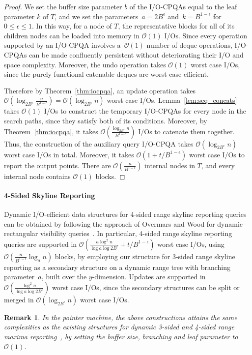 \documentclass[]{article}
\newcommand{\bigO}{\mathcal{O}}
\newtheorem{remark}{Remark}[section]
\begin{document}
\begin{proof}
  We set the buffer size parameter $b$ of the I/O-CPQAs equal to the leaf
  parameter $k$ of $T$, and we set the parameters~$a = 2B^\epsilon$ and~$k =
  B^{1-\epsilon}$ for~$0 \leq \epsilon \leq 1$.  In this way, for a node of $T$,
  the representative blocks for all of its children nodes can be loaded into
  memory in $\bigO(1)$ I/Os. Since every operation supported by an I/O-CPQA
  involves a~$\bigO(1)$ number of deque operations, I/O-CPQAs can be made
  confluently persistent without deteriorating their I/O and space complexity.
  Moreover, the undo operation takes $\bigO(1)$ worst case I/Os, since the
  purely functional catenable deques are worst case efficient.

  Therefore by Theorem~\ref{thm:iocpqa}, an update operation takes $\bigO
  (\log_{2B^{\epsilon}} \frac{n}{B^{1-\epsilon}}) = \bigO(\log_{2B^{\epsilon}}
  n) $ worst case I/Os. Lemma~\ref{lem:seq_concats} takes $\bigO(1)$ I/Os to
  construct the temporary I/O-CPQAs for every node in the search paths, since
  they satisfy both of its conditions. Moreover, by Theorem~\ref{thm:iocpqa}, it
  takes $\bigO(\frac{\log_{2B^{\epsilon}} n}{B^{1-\epsilon}})$ I/Os to
  catenate them together. Thus, the construction of the auxiliary query
  I/O-CPQA takes $\bigO(\log_{2B^{\epsilon}} n)$ worst case I/Os in total.
  Moreover, it takes $\bigO(1 + t/B^{1-\epsilon})$ worst case I/Os to report
  the output points. There are $\bigO(\frac{n}{B^{1- \epsilon}})$ internal
  nodes in $T$, and every internal node contains $\bigO(1)$ blocks.
\end{proof}

\begin{fullenv}
\paragraph{4-Sided Skyline Reporting}

Dynamic I/O-efficient data structures for 4-sided range skyline reporting
queries can be obtained by following the approach of Overmars and Wood for
dynamic rectangular visibility queries~\cite{OW88}. In particular, 4-sided range
skyline reporting queries are supported in $\bigO(\frac{a \log^2 n} {\log a \log
{2B^{\epsilon}} } + t/B^{1-\epsilon})$ worst case I/Os, using
$\bigO(\frac{n}{B^{1-\epsilon}} \log_a n)$ blocks, by employing our structure
for 3-sided range skyline reporting as a secondary structure on a dynamic range
tree with branching parameter~$a$, built over the $y$-dimension. Updates are
supported in $\bigO(\frac{\log^2 n} {\log a \log {2B^{\epsilon}} })$ worst case
I/Os, since the secondary structures can be split or merged in
$\bigO(\log_{2B^\epsilon} n)$ worst case I/Os.

\begin{remark}
  In the pointer machine, the above constructions attains the same
  complexities as the existing structures for dynamic 3-sided and
  4-sided range maxima reporting~\cite{BT11}, by setting the buffer
  size, branching and leaf parameter to $\bigO(1)$.
\end{remark}
\end{fullenv}
\end{document}
